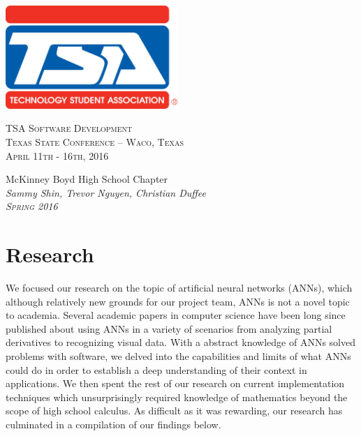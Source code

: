\documentclass[letterpaper, 10pt]{article}
\begin{document}
\begin{titlepage}
	\centering	
	\includegraphics[width=6.50cm]{res/TSA-Emblem.png}
	\vspace{1.15cm}
	
	\scshape\Huge TSA Software Development \\
	\vspace{0.25cm}
	\scshape\huge Texas State Conference -- Waco, Texas \\
	\vspace{0.25cm}
	\scshape\LARGE April 11th - 16th, 2016 \\
	
	\vspace{1.55cm}
	
	\mdseries\Large McKinney Boyd High School Chapter \\
	\vspace{0.25cm}
	\slshape\LARGE Sammy Shin, Trevor Nguyen, Christian Duffee \\
	\vspace{0.25cm}
	\scshape\LARGE Spring 2016 \\
\end{titlepage}

\cleardoublepage

\Large
\tableofcontents
\normalsize

\cleardoublepage

\section{Research}
	We focused our research on the topic of artificial neural networks (ANNs), which although relatively new grounds for our project team, ANNs is not a novel topic to academia. Several academic papers in computer science have been long since published about using ANNs in a variety of scenarios from analyzing partial derivatives to recognizing visual data. With a abstract knowledge of ANNs solved problems with software, we delved into the capabilities and limits of what ANNs could do in order to establish a deep understanding of their context in applications. We then spent the rest of our research on current implementation techniques which unsurprisingly required knowledge of mathematics beyond the scope of high school calculus. As difficult as it was rewarding, our research has culminated in a compilation of our findings below.
\end{document}
